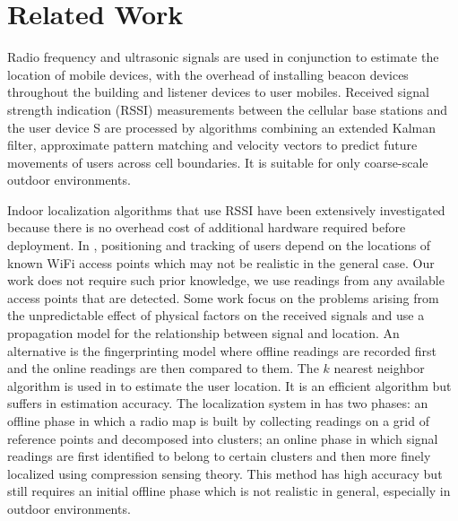 \section{Related Work}
Radio frequency and ultrasonic signals are used in conjunction
\cite{priyantha2000cricket} to estimate the location of mobile devices, with
the overhead of installing beacon devices throughout the building and listener
devices to user mobiles.  
Received signal strength indication (RSSI)
measurements between the cellular base stations and the user device
S\cite{liu1997hierarchical} are processed by algorithms combining an extended
Kalman filter, approximate pattern matching and velocity vectors to predict
future movements of users across cell boundaries.  It is suitable for only coarse-scale outdoor environments.

Indoor localization algorithms that use RSSI have been extensively investigated
\cite{kushki2007kernel,liu2005signal,
hatami2005comparative,paul2008wi,feng2012received} because there is no overhead
cost of additional hardware required before deployment.  In \cite{paul2008wi},
positioning and tracking of users depend on the locations of known WiFi access
points which may not be realistic in the general case.  Our work does not
require such prior knowledge, we use readings from any available access points
that are detected.  Some work \cite{bahl2000radar,ferris2006gaussian} focus on
the problems arising from the unpredictable effect of physical factors on the
received signals and use a propagation model for the relationship between
signal and location.  An alternative is the fingerprinting model
\cite{kaemarungsi2004modeling,li2006indoor, ma2008cluster} where offline
readings are recorded first and the online readings are then compared to them.
The $k$ nearest neighbor algorithm is used in \cite{li2006indoor,ma2008cluster}
to estimate the user location.  It is an efficient algorithm but suffers in
estimation accuracy.  The localization system in \cite{feng2012received} has
two phases: an offline phase in which a radio map is built by collecting
readings on a grid of reference points and decomposed into clusters; an online
phase in which signal readings are first identified to belong to certain
clusters and then more finely localized using compression sensing theory.  This
method has high accuracy but still requires an initial offline phase which is
not realistic in general, especially in outdoor environments.

